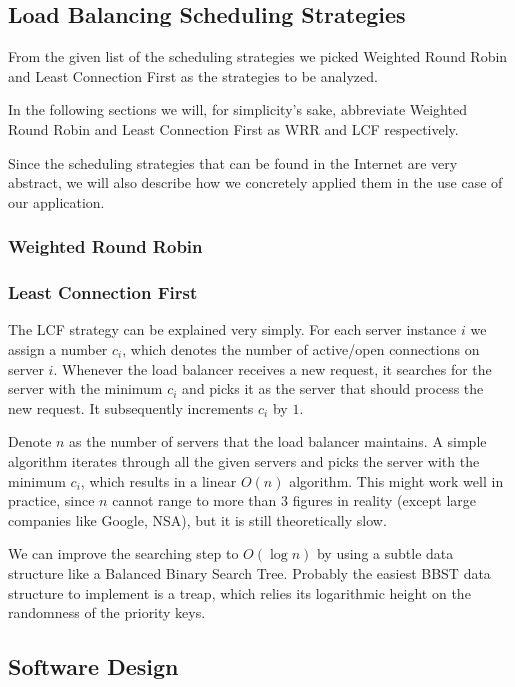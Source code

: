 \documentclass[11pt, a4paper]{article}
\begin{document}

\subsection{Load Balancing Scheduling Strategies}

From the given list of the scheduling strategies we picked Weighted
Round Robin and Least Connection First as the strategies to be
analyzed.

In the following sections we will, for simplicity's sake, abbreviate
Weighted Round Robin and Least Connection First as WRR and LCF
respectively.

Since the scheduling strategies that can be found in the Internet are
very abstract, we will also describe how we concretely applied them in
the use case of our application. 

\subsubsection{Weighted Round Robin}


\subsubsection{Least Connection First}

The LCF strategy can be explained very simply. For each server
instance $i$ we assign a number $c_i$, which denotes the number of
active/open connections on server $i$. Whenever the load balancer
receives a new request, it searches for the server with the minimum
$c_i$ and picks it as the server that should process the new
request. It subsequently increments $c_i$ by $1$. 

Denote $n$ as the number of servers that the load balancer
maintains. A simple algorithm iterates through all the given servers
and picks the server with the minimum $c_i$, which results in a linear
$O(n)$ algorithm. This might work well in practice, since $n$ cannot
range to more than 3 figures in reality (except large companies like
Google, NSA), but it is still theoretically slow. 

We can improve the searching step to $O(\log n)$ by using a subtle
data structure like a Balanced Binary Search Tree. Probably the
easiest BBST data structure to implement is a treap, which relies its
logarithmic height on the randomness of the priority keys.

\subsection{Software Design}
\end{document}
